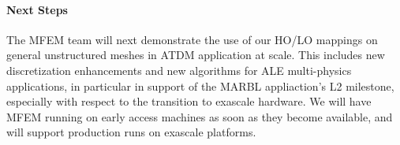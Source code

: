 \begin{itemize}
\end{itemize}

\paragraph{Next Steps}

The MFEM team will next demonstrate the use of our HO/LO mappings on
general unstructured meshes in ATDM application at scale.  This includes
new discretization enhancements and new algorithms for ALE multi-physics
applications, in particular in support of the MARBL appliaction's L2
milestone, especially with respect to the transition to exascale
hardware.  We will have MFEM running on early access machines as soon as
they become available, and will support production runs on exascale platforms.
